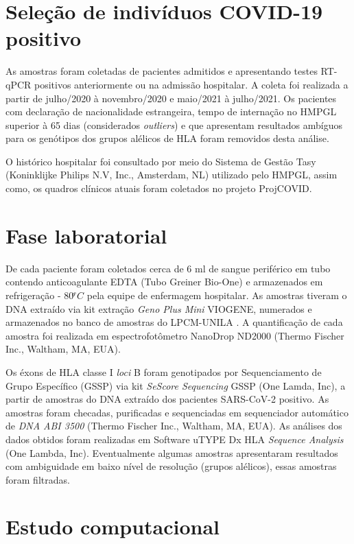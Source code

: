 \begin{justify}
\section{Seleção de indivíduos COVID-19 positivo}

As amostras foram coletadas de pacientes admitidos e apresentando testes RT-qPCR positivos anteriormente ou na admissão hospitalar. A coleta foi realizada a partir de julho/2020 à novembro/2020 e maio/2021 à julho/2021. Os pacientes com declaração de nacionalidade estrangeira, tempo de internação no HMPGL superior à 65 dias (considerados \textit{outliers}) e que apresentam resultados ambíguos para os genótipos dos grupos alélicos de HLA foram removidos desta análise. 

O histórico hospitalar foi consultado por meio do Sistema de Gestão Tasy (Koninklijke Philips N.V, Inc., Amsterdam, NL) utilizado pelo HMPGL, assim como, os quadros clínicos atuais foram coletados no projeto ProjCOVID. 

\section{Fase laboratorial}

De cada paciente foram coletados cerca de 6 ml de sangue periférico em tubo contendo anticoagulante EDTA (Tubo Greiner Bio-One) e armazenados em refrigeração - 80$ ͦ^\circ C$ pela equipe de enfermagem hospitalar. As amostras tiveram o DNA extraído via kit extração \textit{Geno Plus Mini} VIOGENE, numerados e armazenados no banco de amostras do LPCM-UNILA . A quantificação de cada amostra foi realizada em espectrofotômetro NanoDrop ND2000 (Thermo Fischer Inc., Waltham, MA, EUA).

Os éxons de HLA classe I \textit{loci} B foram genotipados por Sequenciamento de Grupo Específico (GSSP) via kit   \textit{SeScore Sequencing}  GSSP (One Lamda, Inc), a partir de amostras do DNA extraído dos pacientes SARS-CoV-2 positivo. As amostras foram checadas, purificadas e sequenciadas em sequenciador automático de \textit{DNA ABI 3500} (Thermo Fischer Inc., Waltham, MA, EUA). As análises dos dados obtidos foram realizadas em Software uTYPE Dx HLA \textit{Sequence Analysis} (One Lambda, Inc). Eventualmente algumas amostras apresentaram resultados com ambiguidade em baixo nível de resolução (grupos alélicos), essas amostras foram filtradas. 

\section{Estudo computacional}


\end{justify}
